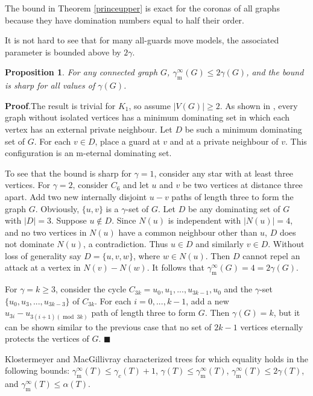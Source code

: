 \documentclass[12pt]{article}%
\newtheorem{proposition}[theorem]{Proposition}
\begin{document}
\bigskip

The bound in Theorem \ref{princeupper} is exact for the coronas of all graphs
because they have domination numbers equal to half their order.

It is not hard to see that for many all-guards move models, the associated
parameter is bounded above by $2\gamma$.

\begin{proposition}
\label{twice} For any connected graph $G$, $\gamma_{\mathrm{m}}^{\infty
}(G)\leq2\gamma(G)$, and the bound is sharp for all values of $\gamma(G)$.
\end{proposition}

\noindent\textbf{Proof}.\hspace{0.1in}The result is trivial for $K_{1}$, so
assume $|V(G)|\geq2$. As shown in \cite{BC}, every graph without isolated
vertices has a minimum dominating set in which each vertex has an external
private neighbour. Let $D$ be such a minimum dominating set of $G$. For each
$v\in D$, place a guard at $v$ and at a private neighbour of $v$. This
configuration is an m-eternal dominating set.

To see that the bound is sharp for $\gamma=1$, consider any star with at least
three vertices. For $\gamma=2$, consider $C_{6}$ and let $u$ and $v$ be two
vertices at distance three apart. Add two new internally disjoint $u-v$ paths
of length three to form the graph $G$. Obviously, $\{u,v\}$ is a $\gamma$-set
of $G$. Let $D$ be any dominating set of $G$ with $|D|=3$. Suppose $u\notin
D$. Since $N(u)$ is independent with $|N(u)|=4$, and no two vertices in $N(u)$
have a common neighbour other than $u$, $D$ does not dominate $N(u)$, a
contradiction. Thus $u\in D$ and similarly $v\in D$. Without loss of
generality say $D=\{u,v,w\}$, where $w\in N(u)$. Then $D$ cannot repel an
attack at a vertex in $N(v)-N(w)$. It follows that $\gamma_{\mathrm{m}%
}^{\infty}(G)=4=2\gamma(G)$.

For $\gamma=k\geq3$, consider the cycle $C_{3k}=u_{0},u_{1},...,u_{3k-1}%
,u_{0}$ and the $\gamma$-set $\{u_{0},u_{3},...,u_{3k-3}\}$ of $C_{3k}$. For
each $i=0,...,k-1$, add a new $u_{3i}-u_{3(i+1)(\operatorname{mod}\ 3k)}$ path
of length three to form $G$. Then $\gamma(G)=k$, but it can be shown similar
to the previous case that no set of $2k-1$ vertices eternally protects the
vertices of $G$. \hfill$\blacksquare$

\bigskip

Klostermeyer and MacGillivray \cite{KM-trees} characterized trees for which
equality holds in the following bounds: $\gamma_{\mathrm{m}}^{\infty}%
(T)\leq\gamma_{c}(T)+1$, $\gamma(T)\leq\gamma_{\mathrm{m}}^{\infty}(T)$,
$\gamma_{\mathrm{m}}^{\infty}(T)\leq2\gamma(T)$, and $\gamma_{\mathrm{m}%
}^{\infty}(T)\leq\alpha(T)$.
\end{document}
